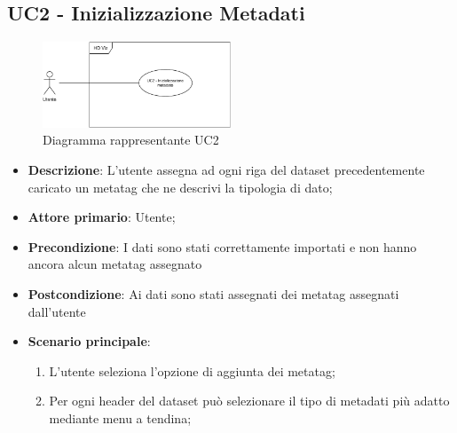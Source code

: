 \subsection{UC2 - Inizializzazione Metadati}
\label{sub:uc2}

\begin{figure}[h]
    \centering
    \includegraphics[width=0.5\textwidth]{componenti/casi-duso/diagrammi/UC2.pdf}
    \caption{Diagramma rappresentante UC2}
    \label{fig:UC2}
\end{figure}

\begin{itemize}
	\item \textbf{Descrizione}: L'utente assegna ad ogni riga del dataset precedentemente caricato
								un metatag che ne descrivi la tipologia di dato;
	
	\item \textbf{Attore primario}: Utente;
	\item \textbf{Precondizione}: 	I dati sono stati correttamente importati e non hanno ancora alcun
									metatag assegnato
	\item \textbf{Postcondizione}:  Ai dati sono stati assegnati dei metatag assegnati dall'utente 

	\item \textbf{Scenario principale}:
		\begin{enumerate}
			\item L'utente seleziona l'opzione di aggiunta dei metatag;
			\item Per ogni header del dataset può selezionare il tipo di metadati più adatto mediante menu a tendina;
		\end{enumerate}
\end{itemize}

